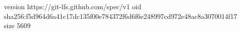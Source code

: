version https://git-lfs.github.com/spec/v1
oid sha256:f5d964d6a41c17dc135f00e784372f6d6f6e248997cd972e48ac8a3070014f17
size 5609
